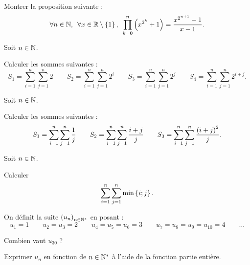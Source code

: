 \begin{corr}
\end{corr}

\begin{exo}[Exercice 9]
Montrer la proposition suivante : \[\quantifs{\forall n\in\N;\forall x\in\R\excluant\accol{1}}\prod_{k=0}^{n}\paren{x^{2^k}+1}=\dfrac{x^{2^{n+1}}-1}{x-1}.\]
\end{exo}

\begin{corr}
\end{corr}

\begin{exo}[Exercice 10]
Soit \(n\in\mathbb{N}\).

Calculer les sommes suivantes : \[S_1=\sum_{i=1}^{n}\sum_{j=1}^{n}2\qquad S_2=\sum_{i=1}^{n}\sum_{j=1}^{n}2^i\qquad S_3=\sum_{i=1}^{n}\sum_{j=1}^{n}2^j\qquad S_4=\sum_{i=1}^{n}\sum_{j=1}^{n}2^{i+j}.\]
\end{exo}

\begin{corr}
\end{corr}

\begin{exo}[Exercice 11]
Soit \(n\in\mathbb{N}\).

Calculer les sommes suivantes : \[S_1=\sum_{i=1}^{n}\sum_{j=1}^{n}\dfrac{1}{j}\qquad S_2=\sum_{i=1}^{n}\sum_{j=1}^{n}\dfrac{i+j}{j}\qquad S_3=\sum_{i=1}^{n}\sum_{j=1}^{n}\dfrac{\left(i+j\right)^2}{j}.\]
\end{exo}

\begin{corr}
\end{corr}

\begin{exo}[Exercice 12]
Soit \(n\in\mathbb{N}\).

Calculer \[\sum_{i=1}^{n}\sum_{j=1}^{n}\min\left\lbrace i;j\right\rbrace.\]
\end{exo}

\begin{corr}
\end{corr}

\begin{exo}[Exercice 13]
On définit la suite \(\left(u_n\right)_{n\in\mathbb{N}^*}\) en posant : \[u_1=1\qquad u_2=u_3=2\qquad u_4=u_5=u_6=3\qquad u_7=u_8=u_9=u_{10}=4\qquad \dots\]

Combien vaut \(u_{30}\) ?

Exprimer \(u_n\) en fonction de \(n\in\mathbb{N}^*\) à l'aide de la fonction partie entière.
\end{exo}

